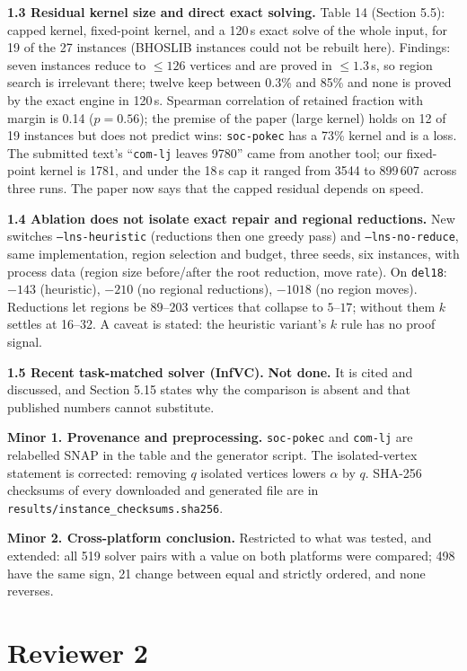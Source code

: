 \documentclass[11pt]{article}
\newcommand{\rev}[1]{\medskip\noindent\textbf{#1}}
\begin{document}
\rev{1.3 Residual kernel size and direct exact solving.}
Table 14 (Section 5.5): capped kernel, fixed-point kernel, and a 120\,s exact
solve of the whole input, for 19 of the 27 instances (BHOSLIB instances could not
be rebuilt here). Findings: seven instances reduce to $\le126$ vertices and are
proved in $\le1.3$\,s, so region search is irrelevant there; twelve keep
between 0.3\% and 85\% and none is proved by the exact engine in 120\,s. Spearman
correlation of retained fraction with margin is 0.14 ($p=0.56$); the premise of
the paper (large kernel) holds on 12 of 19 instances but does not predict wins:
\texttt{soc-pokec} has a 73\% kernel and is a loss. The submitted text's
``\texttt{com-lj} leaves 9780'' came from another tool; our fixed-point kernel
is 1781, and under the 18\,s cap it ranged from 3544 to 899\,607 across three
runs. The paper now says that the capped residual depends on speed.

\rev{1.4 Ablation does not isolate exact repair and regional reductions.}
New switches \texttt{--lns-heuristic} (reductions then one greedy pass) and
\texttt{--lns-no-reduce}, same implementation, region selection and budget,
three seeds, six instances, with process data (region size before/after the
root reduction, move rate). On \texttt{del18}: $-143$ (heuristic), $-210$ (no
regional reductions), $-1018$ (no region moves). Reductions let regions be
$89$--$203$ vertices that collapse to $5$--$17$; without them $k$ settles at
16--32. A caveat is stated: the heuristic variant's $k$ rule has no proof signal.

\rev{1.5 Recent task-matched solver (InfVC).}
\textbf{Not done.} It is cited and discussed, and Section 5.15 states why the
comparison is absent and that published numbers cannot substitute.

\rev{Minor 1. Provenance and preprocessing.}
\texttt{soc-pokec} and \texttt{com-lj} are relabelled SNAP in the table and the
generator script. The isolated-vertex statement is corrected: removing $q$
isolated vertices lowers $\alpha$ by $q$. SHA-256 checksums of every downloaded
and generated file are in \texttt{results/instance\_checksums.sha256}.

\rev{Minor 2. Cross-platform conclusion.}
Restricted to what was tested, and extended: all 519 solver pairs with a value
on both platforms were compared; 498 have the same sign, 21 change between equal
and strictly ordered, and none reverses.

\section*{Reviewer 2}
\end{document}
